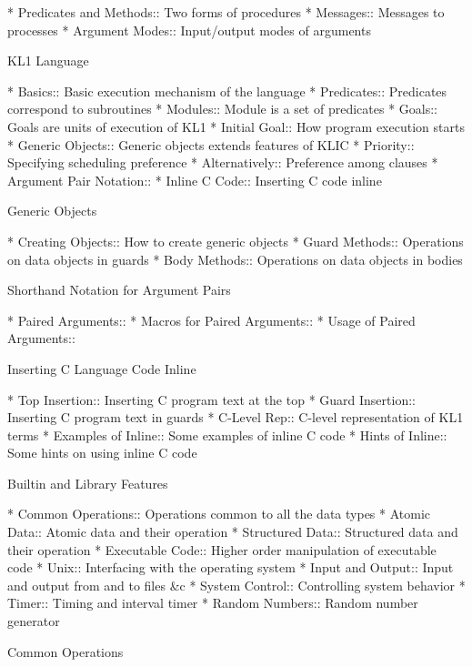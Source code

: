 * Predicates and Methods::      Two forms of procedures
* Messages::                    Messages to processes
* Argument Modes::              Input/output modes of arguments

KL1 Language

* Basics::                      Basic execution mechanism of the language
* Predicates::                  Predicates correspond to subroutines
* Modules::                     Module is a set of predicates
* Goals::                       Goals are units of execution of KL1
* Initial Goal::                How program execution starts
* Generic Objects::             Generic objects extends features of KLIC
* Priority::                    Specifying scheduling preference
* Alternatively::               Preference among clauses
* Argument Pair Notation::      
* Inline C Code::               Inserting C code inline

Generic Objects

* Creating Objects::            How to create generic objects
* Guard Methods::               Operations on data objects in guards
* Body Methods::                Operations on data objects in bodies

Shorthand Notation for Argument Pairs

* Paired Arguments::            
* Macros for Paired Arguments::  
* Usage of Paired Arguments::   

Inserting C Language Code Inline

* Top Insertion::               Inserting C program text at the top
* Guard Insertion::             Inserting C program text in guards
* C-Level Rep::                 C-level representation of KL1 terms
* Examples of Inline::          Some examples of inline C code
* Hints of Inline::             Some hints on using inline C code

Builtin and Library Features

* Common Operations::           Operations common to all the data types
* Atomic Data::                 Atomic data and their operation
* Structured Data::             Structured data and their operation
* Executable Code::             Higher order manipulation of executable code
* Unix::                        Interfacing with the operating system
* Input and Output::            Input and output from and to files &c
* System Control::              Controlling system behavior
* Timer::                       Timing and interval timer
* Random Numbers::              Random number generator

Common Operations

